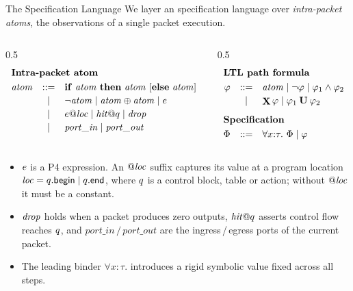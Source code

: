 \begin{frame}{The Specification Language}
  We layer an \LTL{} specification language over \emph{intra-packet atoms}, the observations of a single packet execution.
  \par
  \vspace{-0.2em}
  \begin{columns}[t]
    \begin{column}{0.5\textwidth}
      \[
      \begin{array}{rcl}
        \multicolumn{3}{l}{\textbf{Intra-packet atom}}\\[3pt]
        \specAtom &::=&  \mathbf{if}\ \specAtom\ \mathbf{then}\ \specAtom\ [\mathbf{else}\ \specAtom] \\[2pt]
                  &\mid& \lnot \specAtom \mid \specAtom \oplus \specAtom \mid \specExpr \\[2pt]
                  &\mid& \specExpr @ \specLoc \mid \specHit @ \specBlock \mid \specDrop \\[2pt]
                  &\mid& \mathit{port\_in} \mid \mathit{port\_out}
      \end{array}
      \]
    \end{column}
    \begin{column}{0.5\textwidth}
      \[
      \begin{array}{rcl}
        \multicolumn{3}{l}{\textbf{LTL path formula}}\\[3pt]
        \ltlFormula &::=& \specAtom \mid \lnot \ltlFormula \mid \ltlFormula_1 \land \ltlFormula_2 \\[2pt]
                    &\mid& \Next \ltlFormula \mid \ltlFormula_1 \Until \ltlFormula_2 \\[8pt]
        \multicolumn{3}{l}{\textbf{Specification}}\\[3pt]
        \Phi &::=& \forall x{:}\tau.\ \Phi \mid \ltlFormula
      \end{array}
      \]
    \end{column}
  \end{columns}

  \vspace{0.3em}
  \raggedright\footnotesize
  \begin{itemize}\setlength\itemsep{2pt}
    \item \(e\) is a P4 expression. An \(@\mathit{loc}\) suffix captures its value at a
          program location \(\mathit{loc} = q.\mathsf{begin} \mid q.\mathsf{end}\),
          where \(q\) is a control block, table or action; without \(@\mathit{loc}\) it
          must be a constant.
    \item \(\mathit{drop}\) holds when a packet produces zero outputs, \(\mathit{hit} @ q\)
          asserts control flow reaches \(q\), and \(\mathit{port\_in}\,/\,\mathit{port\_out}\)
          are the ingress\,/\,egress ports of the current packet.
    \item The leading binder \(\forall x{:}\tau.\) introduces a rigid symbolic value fixed
          across all steps.
  \end{itemize}
\end{frame}

